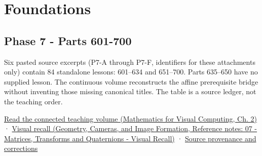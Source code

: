 \hypertarget{appendix-fd090d982a15}{}\label{referencestart:appendix-fd090d982a15}
\section{Foundations}\label{appendix-fd090d982a15-foundations}

\hypertarget{appendix-fd090d982a15-foundations}{}

\subsection{Phase 7 - Parts 601-700}\label{appendix-fd090d982a15-phase-7---parts-601-700}

\hypertarget{appendix-fd090d982a15-phase-7---parts-601-700}{}

Six pasted source excerpts (P7-A through P7-F, identifiers for these attachments only) contain 84 standalone lessons: 601--634 and 651--700. Parts 635--650 have no supplied lesson. The continuous volume reconstructs the affine prerequisite bridge without inventing those missing canonical titles. The table is a source ledger, not the teaching order.

\href{../02-Mathematics-for-Visual-Computing/main.pdf\#nameddest=01-foundations-i-ch018-keep-the-promises-visible-while-moving-between-representations}{Read the connected teaching volume (Mathematics for Visual Computing, Ch. 2)} · \href{../03-Geometry-Cameras-and-Image-Formation/main.pdf\#nameddest=appendix-68f22c734be3}{Visual recall (Geometry, Cameras, and Image Formation, Reference notes: 07 - Matrices, Transforms and Quaternions - Visual Recall)} · \hyperref[appendix-a103e7846d21-phase-7---source-analysis-and-verification]{Source provenance and corrections}


